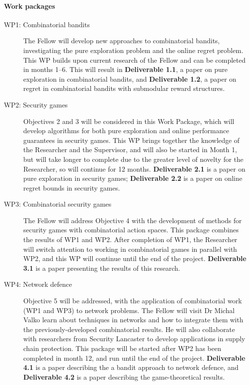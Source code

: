 \documentclass[a4paper,11pt]{article}
\begin{document}
\paragraph{Work packages}
\begin{description}
\item[WP1: Combinatorial bandits] The Fellow will develop new approaches to combinatorial bandits, investigating the pure exploration problem and the online regret problem.  This WP builds upon current research of the Fellow and can be completed in months 1--6.  This will result in {\bf Deliverable 1.1}, a paper on pure exploration in combinatorial bandits, and {\bf Deliverable 1.2}, a paper on regret in combinatorial bandits with submodular reward structures.
\item[WP2: Security games] Objectives 2 and 3 will be considered in this Work Package, which will develop algorithms for both pure exploration and online performance guarantees in security games.  This WP brings together the knowledge of the Researcher and the Supervisor, and will also be started in Month 1, but will take longer to complete due to the greater level of novelty for the Researcher, so will continue for 12 months.  {\bf Deliverable 2.1} is a paper on pure exploration in security games; {\bf Deliverable 2.2} is a paper on online regret bounds in security games.
\item[WP3: Combinatorial security games] The Fellow will address Objective 4 with the development  of methods for security games with combinatorial action spaces. This package combines the results of WP1 and WP2.  After completion of WP1, the Researcher will switch attention to working in combinatorial games in parallel with WP2, and this WP will continue until the end of the project.  {\bf Deliverable 3.1} is a paper presenting the results of this research.
\item[WP4: Network defence] Objective 5 will be addressed, with the application of combinatorial work (WP1 and WP3) to network problems. The Fellow will visit Dr Michal Valko learn about techniques in networks and how to integrate them with the previously-developed combinatorial results.  He will also collaborate with researchers from Security Lancaster to develop applications in supply chain protection.  This package will be started after WP2 has been completed in month 12, and run until the end of the project. {\bf Deliverable 4.1} is a paper describing the a bandit approach to network defence, and {\bf Deliverable 4.2} is a paper describing the game-theoretical results.
\end{description}
\end{document}
